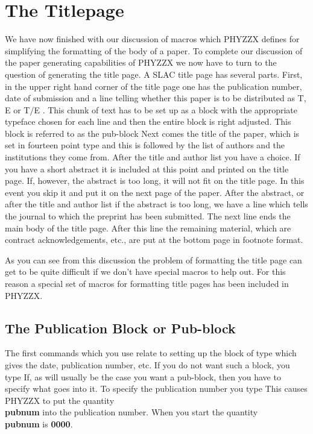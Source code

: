  
\section{The Titlepage}
 
We have now finished with our discussion of macros which PHYZZX
defines for simplifying the formatting of the body of a paper.
To complete our discussion of the paper generating capabilities
of PHYZZX we now have to turn to the question of generating
the title page.
A SLAC title page has several parts.
\pointbegin
First, in the upper right hand corner of the title page
one has the publication number, date of submission and
a line telling whether this paper is to be distributed as
T, E or T/E .
This chunk of text has to be set up as a block with the
appropriate typeface chosen for each line and then the
entire block is right adjusted.
This block is referred to as the pub-block
\point
Next comes the title of the paper, which is set in fourteen point
type and this is followed by the list of authors and the
institutions they come from.
\point
After the title and author list you have a choice.
If you have a short abstract it is included at this point
and printed on the title page.
If, however, the abstract is too long, it will not fit
on the title page.
In this event you skip it and put it on the next page of the paper.
\point
After the abstract, or after the title and author list if the abstract
is too long, we have a line which tells the journal to which the
preprint has been submitted.
\point
The next line ends the main body of the title page.
After this line the remaining material, which are contract
acknowledgements, etc., are put at the bottom page in footnote format.
 
As you can see from this discussion the problem of formatting
the title page can get to be quite difficult if we don't have
special macros to help out.
For this reason a special set of macros for formatting title pages
has been included in PHYZZX.
 
\subsection{The Publication Block or Pub-block}
 
The first commands which you use relate to setting up the
block of type which gives the date, publication number, etc.
If you do not want such a block, you type
\tc{\\nopubblock}
If, as will usually be the case you want a pub-block, then
you have to specify what goes into it.
To specify the publication number you type
This causes PHYZZX to put the quantity {\bf \\pubnum} into
the publication number.
When you start the quantity {\bf \\pubnum} is {\bf 0000}.
 
